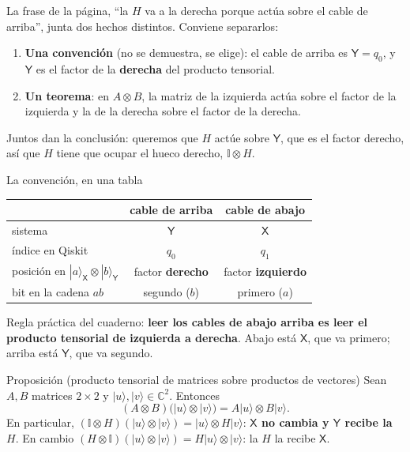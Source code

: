 \documentclass[11pt, a4paper, twoside, openright]{report}
\newenvironment{bloque}{\par\noindent\begin{minipage}{\linewidth}\setlength{\parskip}{4pt}}{\end{minipage}\par\medskip}
\providecommand{\ket}[1]{|#1\rangle}
\newcommand{\X}{\mathsf{X}}
\newcommand{\Y}{\mathsf{Y}}
\newcommand{\I}{\mathbb{I}}
\begin{document}
\begin{bloque}
La frase de la página, ``la $H$ va a la derecha porque actúa sobre el cable de arriba'', junta dos hechos distintos. Conviene separarlos:
\begin{enumerate}
  \item \textbf{Una convención} (no se demuestra, se elige): el cable de arriba es $\Y=q_0$, y $\Y$ es el factor de la \textbf{derecha} del producto tensorial.
  \item \textbf{Un teorema}: en $A\otimes B$, la matriz de la izquierda actúa sobre el factor de la izquierda y la de la derecha sobre el factor de la derecha.
\end{enumerate}
Juntos dan la conclusión: queremos que $H$ actúe sobre $\Y$, que es el factor derecho, así que $H$ tiene que ocupar el hueco derecho, $\I\otimes H$.
\end{bloque}

\begin{aclaracion}{La convención, en una tabla}
\centering
\renewcommand{\arraystretch}{1.3}
\begin{tabular}{l|c|c}
 & cable de \textbf{arriba} & cable de \textbf{abajo}\\ \hline
sistema & $\Y$ & $\X$\\
índice en Qiskit & $q_0$ & $q_1$\\
posición en $\ket{a}_\X\otimes\ket{b}_\Y$ & factor \textbf{derecho} & factor \textbf{izquierdo}\\
bit en la cadena $ab$ & segundo ($b$) & primero ($a$)
\end{tabular}

\medskip
\raggedright
Regla práctica del cuaderno: \textbf{leer los cables de abajo arriba es leer el producto tensorial de izquierda a derecha}. Abajo está $\X$, que va primero; arriba está $\Y$, que va segundo.
\end{aclaracion}

\begin{teoria}{Proposición (producto tensorial de matrices sobre productos de vectores)}
Sean $A,B$ matrices $2\times2$ y $\ket{u},\ket{v}\in\mathbb{C}^2$. Entonces
\[
(A\otimes B)\big(\ket{u}\otimes\ket{v}\big) = A\ket{u}\otimes B\ket{v}.
\]
En particular, $(\I\otimes H)(\ket{u}\otimes\ket{v}) = \ket{u}\otimes H\ket{v}$: \textbf{$\X$ no cambia y $\Y$ recibe la $H$}. En cambio $(H\otimes\I)(\ket{u}\otimes\ket{v}) = H\ket{u}\otimes\ket{v}$: la $H$ la recibe $\X$.
\end{teoria}
\end{document}
